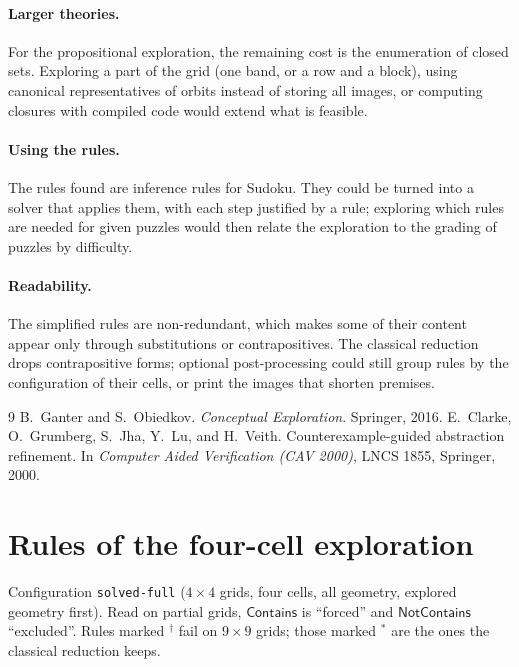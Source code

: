 \documentclass[11pt,a4paper]{article}
\theoremstyle{definition}
\theoremstyle{remark}
\newcommand{\code}[1]{\texttt{#1}}
\newcommand{\pred}[1]{\mathsf{#1}}
\newcommand{\Contains}{\pred{Contains}}
\newcommand{\NotContains}{\pred{NotContains}}
\begin{document}
\paragraph{Larger theories.}
For the propositional exploration, the remaining cost is the enumeration of closed sets. Exploring a part of the grid (one band, or a row and a block), using canonical representatives of orbits instead of storing all images, or computing closures with compiled code would extend what is feasible.

\paragraph{Using the rules.}
The rules found are inference rules for Sudoku. They could be turned into a solver that applies them, with each step justified by a rule; exploring which rules are needed for given puzzles would then relate the exploration to the grading of puzzles by difficulty.

\paragraph{Readability.}
The simplified rules are non-redundant, which makes some of their content appear only through substitutions or contrapositives. The classical reduction drops contrapositive forms; optional post-processing could still group rules by the configuration of their cells, or print the images that shorten premises.

\begin{thebibliography}{9}
 B.~Ganter and S.~Obiedkov. \emph{Conceptual Exploration}. Springer, 2016.
 E.~Clarke, O.~Grumberg, S.~Jha, Y.~Lu, and H.~Veith. Counterexample-guided abstraction refinement. In \emph{Computer Aided Verification (CAV 2000)}, LNCS 1855, Springer, 2000.
\end{thebibliography}

\appendix

\section{Rules of the four-cell exploration}\label{app:full}

Configuration \code{solved-full} ($4 \times 4$ grids, four cells, all geometry, explored geometry first). Read on partial grids, $\Contains$ is ``forced'' and $\NotContains$ ``excluded''. Rules marked $^{\dagger}$ fail on $9 \times 9$ grids; those marked $^{\ast}$ are the ones the classical reduction keeps.
\end{document}
